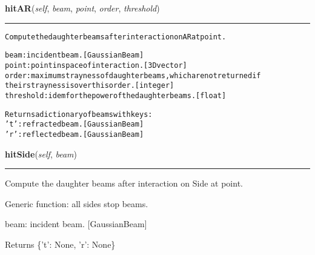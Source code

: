     \label{theia:optics:optic:Optic:hitAR}

    \vspace{0.5ex}

\hspace{.8\funcindent}\begin{boxedminipage}{\funcwidth}

    \raggedright \textbf{hitAR}(\textit{self}, \textit{beam}, \textit{point}, \textit{order}, \textit{threshold})

    \vspace{-1.5ex}

    \rule{\textwidth}{0.5\fboxrule}
\setlength{\parskip}{2ex}
\begin{alltt}
Compute the daughter beams after interaction on AR at point.

beam: incident beam. [GaussianBeam]
point: point in space of interaction. [3D vector]
order: maximum strayness of daughter beams, which are not returned if
    their strayness is over this order. [integer]
threshold: idem for the power of the daughter beams. [float]

Returns a dictionary of beams with keys:
    't': refracted beam. [GaussianBeam]
    'r': reflected beam. [GaussianBeam]
\end{alltt}

\setlength{\parskip}{1ex}
    \end{boxedminipage}

    \label{theia:optics:optic:Optic:hitSide}

    \vspace{0.5ex}

\hspace{.8\funcindent}\begin{boxedminipage}{\funcwidth}

    \raggedright \textbf{hitSide}(\textit{self}, \textit{beam})

    \vspace{-1.5ex}

    \rule{\textwidth}{0.5\fboxrule}
\setlength{\parskip}{2ex}
    Compute the daughter beams after interaction on Side at point.

    Generic function: all sides stop beams.

    beam: incident beam. [GaussianBeam]

    Returns \{'t': None, 'r': None\}

\setlength{\parskip}{1ex}
    \end{boxedminipage}

